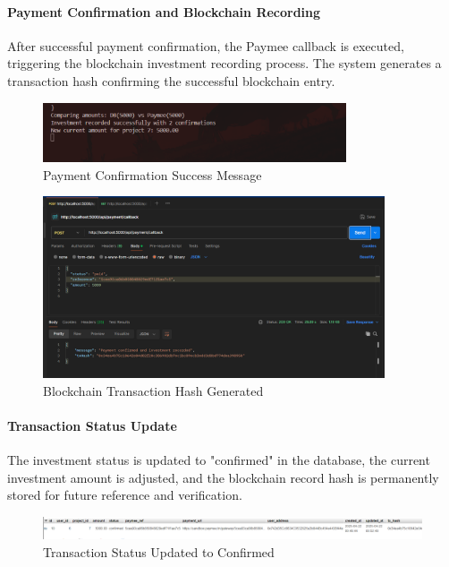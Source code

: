 \newpage

\paragraph{Payment Confirmation and Blockchain Recording}
After successful payment confirmation, the Paymee callback is executed, triggering the blockchain investment recording process. The system generates a transaction hash confirming the successful blockchain entry.

\begin{figure}[htbp]
    \centering
    \includegraphics[width=0.8\textwidth]{images/payment_confirmation_success.png}
    \caption{Payment Confirmation Success Message}
    \label{fig:payment-confirmation-success}
\end{figure}

\begin{figure}[htbp]
    \centering
    \includegraphics[width=0.9\textwidth]{images/blockchain_hash_generated.png}
    \caption{Blockchain Transaction Hash Generated}
    \label{fig:blockchain-hash-generated}
\end{figure}

\newpage
\paragraph{Transaction Status Update}
The investment status is updated to "confirmed" in the database, the current investment amount is adjusted, and the blockchain record hash is permanently stored for future reference and verification.

\begin{figure}[htbp]
    \centering
    \includegraphics[width=1\textwidth]{images/transaction_confirmed_status.png}
    \caption{Transaction Status Updated to Confirmed}
    \label{fig:transaction-confirmed-status}
\end{figure}

